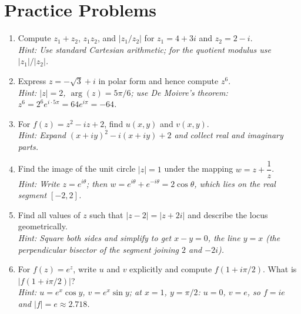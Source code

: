 \documentclass[12pt,a4paper]{article}
\begin{document}
\section{Practice Problems}

\begin{enumerate}
  \item Compute \(z_1 + z_2\), \(z_1 z_2\), and \(|z_1/z_2|\) for
        \(z_1 = 4+3i\) and \(z_2 = 2-i\).\\
        \textit{Hint: Use standard Cartesian arithmetic; for the quotient
        modulus use \(|z_1|/|z_2|\).}

  \item Express \(z = -\sqrt{3}+i\) in polar form and hence compute \(z^6\).\\
        \textit{Hint: \(|z|=2\), \(\arg(z)=5\pi/6\); use De Moivre's theorem:
        \(z^6 = 2^6 e^{i\cdot 5\pi} = 64e^{i\pi} = -64\).}

  \item For \(f(z) = z^2 - iz + 2\), find \(u(x,y)\) and \(v(x,y)\).\\
        \textit{Hint: Expand \((x+iy)^2 - i(x+iy)+2\) and collect real and
        imaginary parts.}

  \item Find the image of the unit circle \(|z|=1\) under the mapping
        \(w = z + \dfrac{1}{z}\).\\
        \textit{Hint: Write \(z = e^{i\theta}\); then \(w = e^{i\theta}+e^{-i\theta}
        = 2\cos\theta\), which lies on the real segment \([-2,2]\).}

  \item Find all values of \(z\) such that \(|z - 2| = |z + 2i|\) and
        describe the locus geometrically.\\
        \textit{Hint: Square both sides and simplify to get \(x - y = 0\),
        the line \(y = x\) (the perpendicular bisector of the segment joining
        \(2\) and \(-2i\)).}

  \item For \(f(z) = e^z\), write \(u\) and \(v\) explicitly and compute
        \(f(1+i\pi/2)\).  What is \(|f(1+i\pi/2)|\)?\\
        \textit{Hint: \(u = e^x\cos y\), \(v = e^x\sin y\); at \(x=1\),
        \(y=\pi/2\): \(u=0\), \(v=e\), so \(f = ie\) and
        \(|f| = e \approx 2.718\).}
\end{enumerate}
\end{document}
